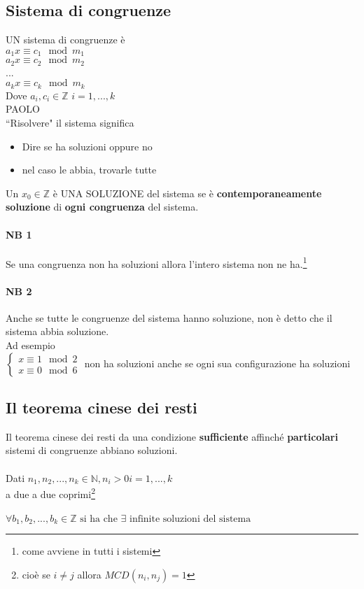 \subsection{Sistema di congruenze}
UN sistema di congruenze è \\
$a_1x\equiv c_1\mod m_1$\\
$a_2x\equiv c_2\mod m_2$\\
...\\
$a_kx\equiv c_k\mod m_k$\\
Dove $a_i,c_i\in\mathbb{Z}$ $i=1,...,k$\\
{\color{purple}PAOLO\\}
{\color{red} ``Risolvere"} il sistema significa
\begin{itemize}
    \item Dire se ha soluzioni oppure no
    \item nel caso le abbia, trovarle tutte
\end{itemize}
Un $x_0\in\mathbb{Z}$ è UNA SOLUZIONE del sistema se è \textbf{contemporaneamente soluzione} 
di \textbf{ogni congruenza} del sistema. 
    
\paragraph{NB 1} Se una congruenza non ha soluzioni allora l'intero sistema non ne ha.\footnote{
    come avviene in tutti i sistemi} \\
\paragraph{NB 2} Anche se tutte le congruenze del sistema hanno soluzione, non è detto che il sistema abbia soluzione.\\
Ad esempio\\

$
\begin{cases}
    x\equiv 1\mod 2\\
    x\equiv 0\mod 6
\end{cases}$
non ha soluzioni anche se ogni sua configurazione ha soluzioni

\newpage
\subsection{Il teorema cinese dei resti}
Il teorema cinese dei resti da una condizione \textbf{sufficiente} affinché \textbf{particolari} sistemi di congruenze abbiano soluzioni. \\\\
Dati $n_1, n_2,...,n_k\in\mathbb{N}, n_i>0$\hspace{1cm}$i=1,...,k$\\
{\color{red} a due a due coprimi}\footnote{cioè se $i\neq j$ allora 
$MCD(n_i, n_j)=1$}\\\\
$\forall b_1,b_2,...,b_k\in\mathbb{Z}\textrm{ si ha che }
\exists \textrm{ infinite soluzioni del sistema}$\\

